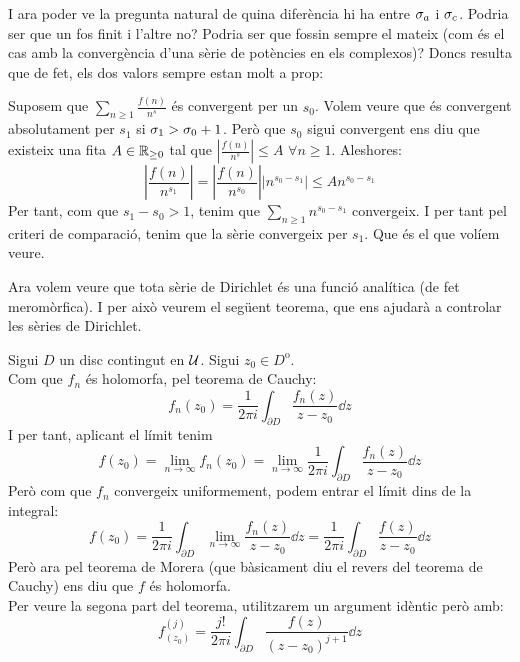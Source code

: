 I ara poder ve la pregunta natural de quina diferència hi ha entre $\sigma_a$ i $\sigma_c$. Podria ser que un fos finit i l'altre no? Podria ser que fossin sempre el mateix (com és el cas amb la convergència d'una sèrie de potències en els complexos)? Doncs resulta que de fet, els dos valors sempre estan molt a prop:
\begin{pf}
    Suposem que $\sum_{n\geq 1}\frac{f(n)}{n^s}$ és convergent per un $s_0$. Volem veure que és convergent absolutament per $s_1$ si $\sigma_1>\sigma_0+1$. Però que $s_0$ sigui convergent ens diu que existeix una fita $A\in\mathbb R_{\geq0}$ tal que $\left|\frac{f(n)}{n^s}\right|\leq A$ $\forall n \geq 1$. Aleshores:
    \[
    \left|\frac{f(n)}{n^{s_1}}\right|=\left|\frac{f(n)}{n^{s_0}}\right|\left|n^{s_0-s_1}\right|\leq An^{s_0-s_1}
    \]
    Per tant, com que $s_1-s_0>1$, tenim que $\sum_{n\geq 1}n^{s_0-s_1}$ convergeix. I per tant pel criteri de comparació, tenim que la sèrie convergeix per $s_1$. Que és el que volíem veure.
\end{pf}
Ara volem veure que tota sèrie de Dirichlet és una funció analítica (de fet meromòrfica). I per això veurem el següent teorema, que ens ajudarà a controlar les sèries de Dirichlet. 
\begin{pf}
    Sigui $D$ un disc contingut en $\mathcal{U}$. Sigui $z_0\in D^\mathrm{o}$.\\

    Com que $f_n$ és holomorfa, pel teorema de Cauchy:
    \[
    f_n(z_0)=\frac{1}{2\pi i}\int_{\partial D}\frac{f_n(z)}{z-z_0}\dd z
    \]
    I per tant, aplicant el límit tenim
    \[
    f(z_0)=\lim_{n\rightarrow\infty}f_n(z_0)=\lim_{n\rightarrow\infty}\frac{1}{2\pi i}\int_{\partial D}\frac{f_n(z)}{z-z_0}\dd z
    \]
    Però com que $f_n$ convergeix uniformement, podem entrar el límit dins de la integral:
    \[
    f(z_0)=\frac{1}{2\pi i}\int_{\partial D}\lim_{n\rightarrow\infty}\frac{f_n(z)}{z-z_0}\dd z=\frac{1}{2\pi i}\int_{\partial D}\frac{f(z)}{z-z_0}\dd z
    \]
    Però ara pel teorema de Morera (que bàsicament diu el revers del teorema de Cauchy) ens diu que $f$ és holomorfa.\\

    Per veure la segona part del teorema, utilitzarem un argument idèntic però amb:
    \[
    f_(z_0)^{(j)}=\frac{j!}{2\pi i}\int_{\partial D}\frac{f(z)}{(z-z_0)^{j+1}}\dd z
    \]
\end{pf}
